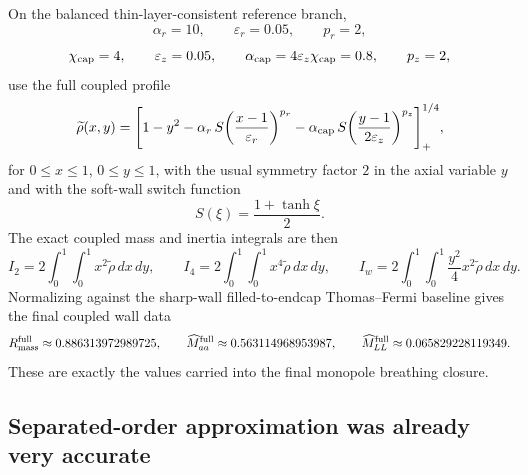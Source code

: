 \documentclass[11pt]{article}
\begin{document}
On the balanced thin-layer-consistent reference branch,
\begin{equation}
\alpha_r=10,
\qquad
\varepsilon_r=0.05,
\qquad
p_r=2,
\label{eq:family1-final-radial-branch}
\end{equation}
\begin{equation}
\chi_{\rm cap}=4,
\qquad
\varepsilon_z=0.05,
\qquad
\alpha_{\rm cap}=4\varepsilon_z\chi_{\rm cap}=0.8,
\qquad
p_z=2,
\label{eq:family1-final-cap-branch}
\end{equation}
use the full coupled profile
\begin{equation}
\widetilde\rho(x,y)
=
\Biggl[
1-y^2
-\alpha_r\,S\!\left(\frac{x-1}{\varepsilon_r}\right)^{p_r}
-\alpha_{\rm cap}\,S\!\left(\frac{y-1}{2\varepsilon_z}\right)^{p_z}
\Biggr]_+^{1/4},
\label{eq:family1-final-rhotilde}
\end{equation}
for \(0\le x\le 1\), \(0\le y\le 1\), with the usual symmetry factor \(2\) in the
axial variable \(y\) and with the soft-wall switch function
\begin{equation}
S(\xi)=\frac{1+\tanh\xi}{2}.
\label{eq:family1-final-switch}
\end{equation}
The exact coupled mass and inertia integrals are then
\begin{equation}
I_2 = 2\int_0^1\!\!\int_0^1 x^2\widetilde\rho\,dx\,dy,
\qquad
I_4 = 2\int_0^1\!\!\int_0^1 x^4\widetilde\rho\,dx\,dy,
\qquad
I_w = 2\int_0^1\!\!\int_0^1 \frac{y^2}{4}x^2\widetilde\rho\,dx\,dy.
\label{eq:family1-final-I2I4Iw}
\end{equation}
Normalizing against the sharp-wall filled-to-endcap Thomas--Fermi baseline gives the
final coupled wall data
\begin{equation}
R_{\rm mass}^{\rm full}\approx 0.886313972989725,
\qquad
\widehat M_{aa}^{\rm full}\approx 0.563114968953987,
\qquad
\widehat M_{LL}^{\rm full}\approx 0.065829228119349.
\label{eq:family1-final-coupled-inertia}
\end{equation}
These are exactly the values carried into the final monopole breathing closure.

\subsection{Separated-order approximation was already very accurate}
\label{app:family1-final-separated-check}
\end{document}
